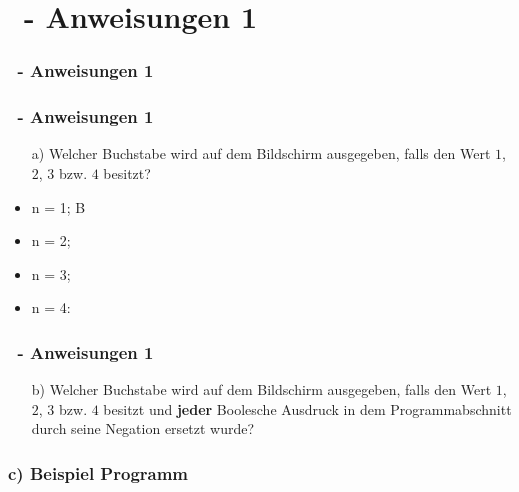 \def\stitle{\theexercise\ - Anweisungen 1}
\section{\stitle}
\begin{frame}
    \frametitle{\stitle}
\tableofcontents[current]    
\end{frame}


\begin{frame}[t]%
    \frametitle{\stitle}

\begin{itemize}
\item[a)] Welcher Buchstabe wird auf dem Bildschirm ausgegeben, falls  den Wert $1$, $2$, $3$ bzw. $4$ besitzt?
\end{itemize}

\pause

\begin{center}
\begin{minipage}{0.4\textwidth}
\begin{itemize}
\item n = 1; B
\item n = 2;
\end{itemize}
\end{minipage}
\begin{minipage}{0.5\textwidth}
\begin{itemize}
\item n = 3;
\item n = 4:
\end{itemize}
\end{minipage}
\end{center}

\end{frame}


\begin{frame}[t]%
    \frametitle{\stitle}

\begin{itemize}
\item[b)] Welcher Buchstabe wird auf dem Bildschirm ausgegeben, falls  den Wert $1$, $2$, $3$ bzw. $4$ besitzt und \textbf{jeder} Boolesche Ausdruck in dem Programm\-abschnitt durch seine Negation ersetzt wurde?
\end{itemize}


\end{frame}


\begin{frame}[fragile]%
 \frametitle{c) Beispiel Programm}%

\end{frame}
